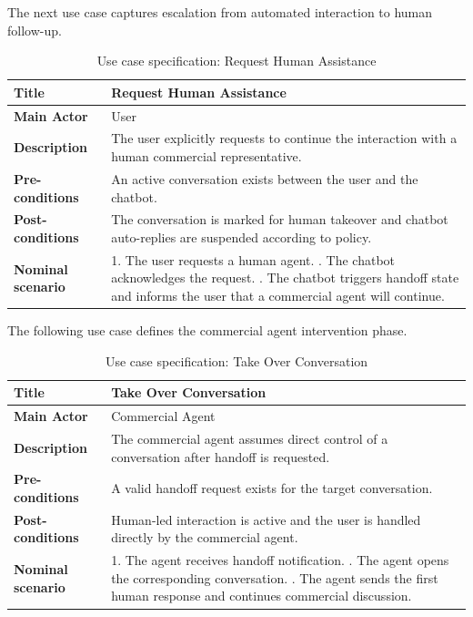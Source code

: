 \noindent The next use case captures escalation from automated interaction to human follow-up.
\begin{table}[H]
\centering
\caption{Use case specification: Request Human Assistance}
\label{tab:uc-request-human-assistance}
\begin{tabular}{|p{}|p{}|}
\hline
\textbf{Title} & Request Human Assistance \\
\hline
\textbf{Main Actor} & User \\
\hline
\textbf{Description} & The user explicitly requests to continue the interaction with a human commercial representative. \\
\hline
\textbf{Pre-conditions} & An active conversation exists between the user and the chatbot. \\
\hline
\textbf{Post-conditions} & The conversation is marked for human takeover and chatbot auto-replies are suspended according to policy. \\
\hline
\textbf{Nominal scenario} & 1. The user requests a human agent. \newline 2. The chatbot acknowledges the request. \newline 3. The chatbot triggers handoff state and informs the user that a commercial agent will continue. \\
\hline
\end{tabular}
\end{table}

\noindent The following use case defines the commercial agent intervention phase.
\begin{table}[H]
\centering
\caption{Use case specification: Take Over Conversation}
\label{tab:uc-take-over-conversation}
\begin{tabular}{|p{}|p{}|}
\hline
\textbf{Title} & Take Over Conversation \\
\hline
\textbf{Main Actor} & Commercial Agent \\
\hline
\textbf{Description} & The commercial agent assumes direct control of a conversation after handoff is requested. \\
\hline
\textbf{Pre-conditions} & A valid handoff request exists for the target conversation. \\
\hline
\textbf{Post-conditions} & Human-led interaction is active and the user is handled directly by the commercial agent. \\
\hline
\textbf{Nominal scenario} & 1. The agent receives handoff notification. \newline 2. The agent opens the corresponding conversation. \newline 3. The agent sends the first human response and continues commercial discussion. \\
\hline
\end{tabular}
\end{table}

